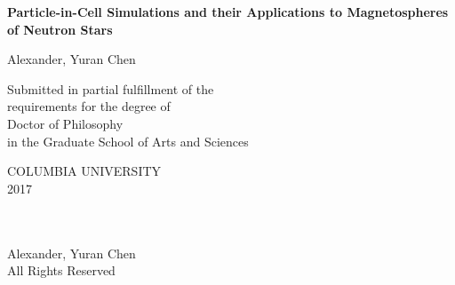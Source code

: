 
\newcommand{\thesistitle}{Particle-in-Cell Simulations and their Applications
 \protect\linebreak[1]to Magnetospheres of Neutron Stars}
\newcommand{\thesisauthor}{Alexander, Yuran Chen}
\newcommand{\thesisyear}{2017}


$\phantom{a}$

$\phantom{a}$

$\phantom{a}$

\begin{center}

{\LARGE \bf \thesistitle}

\vskip1.0in

{\Large  \thesisauthor} \vskip0.5in

\vskip1.5in

\large
Submitted in partial fulfillment of the \\
requirements for the degree of \\
Doctor of Philosophy \\
in the Graduate School of Arts and Sciences \\

\vskip0.5in

COLUMBIA UNIVERSITY \\
\thesisyear \\

\end{center}
\clearpage

\begin{center}
\ \\
\vskip6.5in
\textcopyright \thesisyear \\[3mm]
\thesisauthor \\
All Rights Reserved
\end{center}
\clearpage

